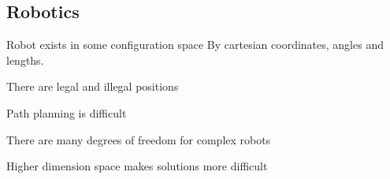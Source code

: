
\subsection{Robotics}

Robot exists in some configuration space
By cartesian coordinates, angles and lengths.

There are legal and illegal positions

Path planning is difficult

There are many degrees of freedom for complex robots

Higher dimension space makes solutions more difficult

